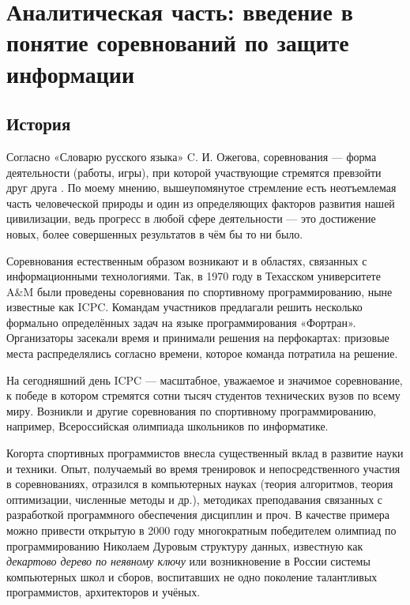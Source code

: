 \chapter{Аналитическая часть: введение в понятие соревнований по защите информации}
\label{cha:analysis}

\section{История}
\label{cha:analysis:history}

Согласно «Словарю русского языка» C. И. Ожегова, соревнования --- форма деятельности (работы, игры), при которой участвующие стремятся превзойти друг друга \cite{Ozhegov89}. По моему мнению, вышеупомянутое стремление есть неотъемлемая часть человеческой природы и один из определяющих факторов развития нашей цивилизации, ведь прогресс в любой сфере деятельности --- это достижение новых, более совершенных результатов в чём бы то ни было.


Соревнования естественным образом возникают и в областях, связанных с информационными технологиями. Так, в 1970 году в Техасском университете A\&M были проведены соревнования по спортивному программированию, ныне известные как ICPC\cite{AboutICPC}. Командам участников предлагали решить несколько формально определённых задач на языке программирования «Фортран». Организаторы засекали время и принимали решения на перфокартах: призовые места распределялись согласно времени, которое команда потратила на решение.

На сегодняшний день ICPC — масштабное, уважаемое и значимое соревнование, к победе в котором стремятся сотни тысяч студентов технических вузов по всему миру. Возникли и другие соревнования по спортивному программированию, например, Всероссийская олимпиада школьников по информатике.

Когорта спортивных программистов внесла существенный вклад в развитие науки и техники. Опыт, получаемый во время тренировок и непосредственного участия в соревнованиях, отразился в компьютерных науках (теория алгоритмов, теория оптимизации, численные методы и др.), методиках преподавания связанных с разработкой программного обеспечения дисциплин и проч. В качестве примера можно привести открытую в 2000 году многократным победителем олимпиад по программированию Николаем Дуровым структуру данных, известную как \textit{декартово дерево по неявному ключу}\cite{Durov00} или возникновение в России системы компьютерных школ и сборов, воспитавших не одно поколение талантливых программистов, архитекторов и учёных\cite{Netrusova09}\cite{Kraivanova12}.

